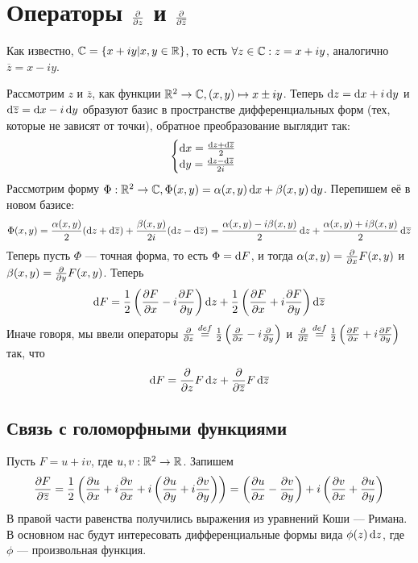 \documentclass[a4paper]{report}
\begin{document}
    \section{Операторы $\der{}{z}$ и $\der{}{\overline{z}}$}
    Как известно, $\C = \defset{x + iy}{x, y \in \R}$, то есть $\forall z \in \C: z = x + iy$, аналогично $\overline{z} = x - iy$.

    Рассмотрим $z$ и $\overline{z}$, как функции $\R^2 \map \C, (x, y) \mapsto x \pm iy$.
    Теперь $\d z = \d x + i \d y$ и $\d \overline{z} = \d x - i \d y$ образуют базис в пространстве дифференциальных форм (тех, которые не зависят от точки), обратное преобразование выглядит так:
    \[\all{\d x = \frac{\d z + \d \overline{z}}{2} \\ \d y = \frac{\d z - \d \overline{z}}{2i}}\]
    Рассмотрим форму $\Phi: \R^2 \map \C, \Phi(x, y) = \alpha(x, y)\d x + \beta(x, y)\d y$.
    Перепишем её в новом базисе:
    \[\Phi(x, y) = \frac{\alpha(x, y)}{2}(\d z + \d \overline{z}) + \frac{\beta(x, y)}{2i}(\d z - \d\overline{z}) = \frac{\alpha(x, y) - i \beta(x, y)}{2}\d z + \frac{\alpha(x, y) + i \beta(x, y)}{2}\d \overline{z}\]
    Теперь пусть $\Phi$ --- точная форма, то есть $\Phi = \d F$, и тогда $\alpha(x, y) = \der{}{x}F(x, y)$ и $\beta(x, y) = \der{}{y}F(x, y)$. Теперь
    \[\d F = \frac{1}{2}\left(\der{F}{x} - i\der{F}{y}\right)\d z + \frac{1}{2}\left(\der{F}{x} + i \der{F}{y}\right)\d \overline{z}\]
    Иначе говоря, мы ввели операторы $\der{}{z} \bydef \frac{1}{2}\left(\der{}{x} - i\der{}{y}\right)$ и $\der{}{\overline{z}} \bydef \frac{1}{2}\left(\der{F}{x} + i \der{F}{y}\right)$ так, что \[\d F = \der{}{z}F\d z + \der{}{\overline{z}}F\d\overline{z}\]
    \subsection{Связь с голоморфными функциями}
    Пусть $F = u + iv$, где $u, v: \R^2 \map \R$.
    Запишем
    \[\der{F}{\overline{z}} = \frac{1}{2}\left(\der{u}{x} + i\der{v}{x} + i\left(\der{u}{y} + i\der{v}{y}\right)\right) = \left(\der{u}{x} - \der{v}{y}\right) + i\left(\der{v}{x} + \der{u}{y}\right)\]
    В правой части равенства получились выражения из уравнений Коши --- Римана.
    В основном нас будут интересовать дифференциальные формы вида $\phi(z)\d z$, где $\phi$ --- произвольная функция.
\end{document}
